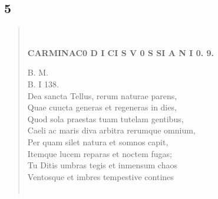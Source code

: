 \documentclass[11pt, a4paper]{report}
\begin{document}
            \subsection*{5}
      \begin{verse}
      
        ﻿\pagebreak 
    \begin{center} \textbf{CARMINAC0 D I CI S V 0 S SI A N I 0. 9.} \end{center}B. M. \\ B. I 138. \\ Dea sancta Tellus, rerum naturae parens, \\ Quae cuucta generas et regeneras in dies, \\ Quod sola praestas  \lbrack tuam \rbrack  tutelam gentibus, \\ Caeli ac maris diva arbitra rerumque omnium, \\ Per quam silet natura et somnos capit, \\ Itemque lucem reparas et noctem fugas; \\ Tu Ditis umbras tegis et inmensum chaos \\ Ventosque et imbres tempestive contines \\ 
        ﻿\pagebreak 

\end{verse}
\end{document}
